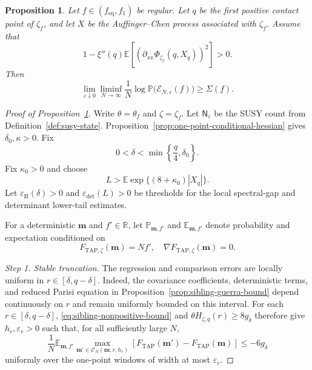 \documentclass[10pt,a4paper]{amsart}
\newtheorem{proposition}{Proposition}
\newcommand{\TAP}{\mathrm{TAP}}
\newcommand{\bfm}{\mathbf{m}}
\newcommand{\dE}{\mathbb{E}}%
\newcommand{\dP}{\mathbb{P}}%
\newcommand{\dR}{\mathbb{R}}%
\newcommand{\eq}{\mathrm{eq}}
\newcommand{\mc}{\mathcal}
\newcommand{\ve}{\varepsilon}
\begin{document}
	\begin{proposition}\label{prop:onshell-lower-bound}
		Let \(f\in(f_{\eq},f_1)\) be regular. Let \(q\) be the first
		positive contact point of \(\zeta_f\), and let \(X\) be the Auffinger--Chen process
		associated with \(\zeta_f\).
		Assume that
		\[
		1-\xi''(q)\dE\left[
		\left(
		\partial_{xx}\Phi_{\zeta_f}(q,X_q)
		\right)^2
		\right]>0.
		\]
		Then
		\[
		\lim_{\ve\downarrow0}
		\liminf_{N\to\infty}
		\frac1N\log\dP\bigl(\mc E_{N,\ve}(f)\bigr)
		\ge\Sigma(f).
		\]
	\end{proposition}

	\begin{proof}[Proof of Proposition~\ref{prop:onshell-lower-bound}]
		Write \(\theta=\theta_f\) and \(\zeta=\zeta_f\).
		Let \(\mathsf N_\ve\) be the SUSY count from
		Definition~\ref{def:susy-state}.
		Proposition~\ref{prop:one-point-conditional-hessian} gives
		\(\delta_0,\kappa>0\). Fix
		\[
		0<\delta<\min\left\{\frac q4,\delta_0\right\}.
		\]
		Fix \(\kappa_0>0\) and choose
		\[
		L>
		\dE\exp\{(8+\kappa_0)|X_q|\}.
		\]
		Let \(\ve_{\mathrm H}(\delta)>0\) and
		\(\ve_{\det}(L)>0\) be thresholds for the
		local spectral-gap and determinant lower-tail estimates.
		
		For a deterministic \(\bfm\) and \(f'\in\dR\), let
		\(\dP_{\bfm,f'}\) and \(\dE_{\bfm,f'}\) denote probability and
		expectation conditioned on
		\[
		F_{\TAP,\zeta}(\bfm)=Nf',\quad
		\nabla F_{\TAP,\zeta}(\bfm)=0.
		\]
		
		\medskip\noindent\emph{Step 1. Stable truncation.}
		The regression and comparison errors are locally uniform in
		\(r\in[\delta,q-\delta]\). Indeed, the covariance coefficients,
		deterministic terms, and reduced Parisi equation in
		Proposition~\ref{prop:sibling-guerra-bound} depend continuously on \(r\)
		and remain uniformly bounded on this interval.
		For each \(r\in[\delta,q-\delta]\),
		\eqref{eq:sibling-nonpositive-bound} and
		\(\theta H_{\zeta,q}(r)\ge8g_\delta\) therefore give
		\(h_r,\ve_r>0\) such that, for all sufficiently large \(N\),
		\[
		\frac1N\dE_{\bfm,f'}
		\max_{\bfm'\in\mc C_N(\bfm,r,h_r)}
		\left[
		F_{\TAP}(\bfm')-F_{\TAP}(\bfm)
		\right]
		\le-6g_\delta
		\]
		uniformly over the one-point windows of width at most
		\(\ve_r\).
		

\end{proof}
\end{document}
